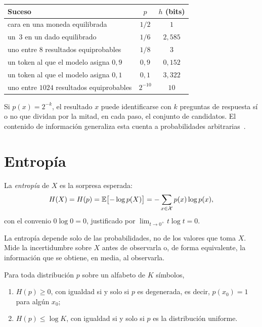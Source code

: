\begin{center}
\begin{tabular}{@{}lcc@{}}
\toprule
Suceso & $p$ & $h$ (bits) \\
\midrule
cara en una moneda equilibrada & $1/2$ & $1$ \\
un~3 en un dado equilibrado & $1/6$ & $2{,}585$ \\
uno entre 8 resultados equiprobables & $1/8$ & $3$ \\
un token al que el modelo asigna $0{,}9$ & $0{,}9$ & $0{,}152$ \\
un token al que el modelo asigna $0{,}1$ & $0{,}1$ & $3{,}322$ \\
uno entre $1024$ resultados equiprobables & $2^{-10}$ & $10$ \\
\bottomrule
\end{tabular}
\end{center}

Si $p(x)=2^{-k}$, el resultado $x$ puede identificarse con $k$ preguntas de respuesta sí o no que dividan por la mitad, en cada paso, el conjunto de candidatos. El contenido de información generaliza esta cuenta a probabilidades arbitrarias~\cite[cap.~4]{mackay}.

\addtocounter{definicion}{1}%

\section{Entropía}

\begin{definicion}[Entropía]\label{def:entropia}
La \emph{entropía} de $X$ es la sorpresa esperada:
\[
H(X)=H(p)=\mathbb{E}\bigl[-\log p(X)\bigr]=-\sum_{x\in\mathcal{X}}p(x)\log p(x),
\]
con el convenio $0\log 0=0$, justificado por $\lim_{t\to 0^{+}}t\log t=0$.
\end{definicion}

La entropía depende solo de las probabilidades, no de los valores que toma $X$. Mide la incertidumbre sobre $X$ antes de observarla o, de forma equivalente, la información que se obtiene, en media, al observarla.

\addtocounter{definicion}{1}%

\addtocounter{definicion}{1}%

\addtocounter{figure}{1}%

\begin{proposicion}\label{prop:cotas-entropia}
Para toda distribución $p$ sobre un alfabeto de $K$ símbolos,
\begin{enumerate}
  \item $H(p)\ge 0$, con igualdad si y solo si $p$ es degenerada, es decir, $p(x_0)=1$ para algún $x_0$;
  \item $H(p)\le\log K$, con igualdad si y solo si $p$ es la distribución uniforme.
\end{enumerate}
\end{proposicion}

